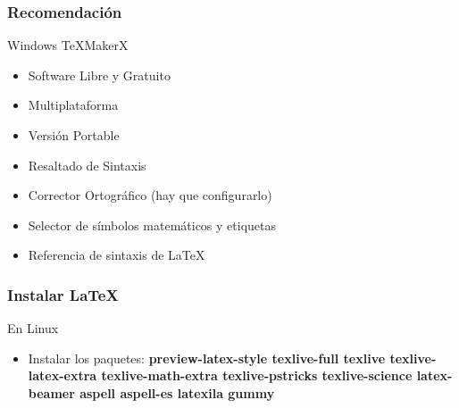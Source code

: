 \documentclass[aspectratio=1610]{beamer}%
\begin{document}
\begin{frame}[fragile]
\frametitle{\textbf{Recomendación}}
\justifying

\begin{block}{Windows}
\TeX{}MakerX
\begin{itemize}\justifying
  \item Software Libre y Gratuito
  \item Multiplataforma
  \item Versión Portable
  \item Resaltado de Sintaxis
  \item Corrector Ortográfico (hay que configurarlo)
  \item Selector de símbolos matemáticos y etiquetas
  \item Referencia de sintaxis de \LaTeX{}
\end{itemize}

\end{block}
\end{frame}

\begin{frame}[fragile]
\frametitle{\textbf{Instalar \LaTeX{}}}
\justifying
\begin{block}{En Linux}
 \begin{itemize}\justifying
  \item Instalar los paquetes: \textbf{preview-latex-style texlive-full texlive texlive-latex-extra texlive-math-extra texlive-pstricks texlive-science latex-beamer aspell aspell-es latexila gummy}
\end{itemize}
\end{block}
\end{frame}
\end{document}
